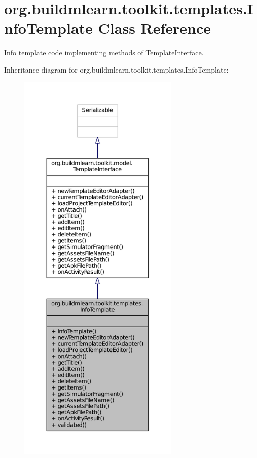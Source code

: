\hypertarget{classorg_1_1buildmlearn_1_1toolkit_1_1templates_1_1InfoTemplate}{\section{org.\-buildmlearn.\-toolkit.\-templates.\-Info\-Template Class Reference}
\label{classorg_1_1buildmlearn_1_1toolkit_1_1templates_1_1InfoTemplate}
}


Info template code implementing methods of Template\-Interface.  




Inheritance diagram for org.\-buildmlearn.\-toolkit.\-templates.\-Info\-Template\-:
\nopagebreak
\begin{figure}[H]
\begin{center}
\leavevmode
\includegraphics[height=550pt]{d2/d3d/classorg_1_1buildmlearn_1_1toolkit_1_1templates_1_1InfoTemplate__inherit__graph}
\end{center}
\end{figure}


